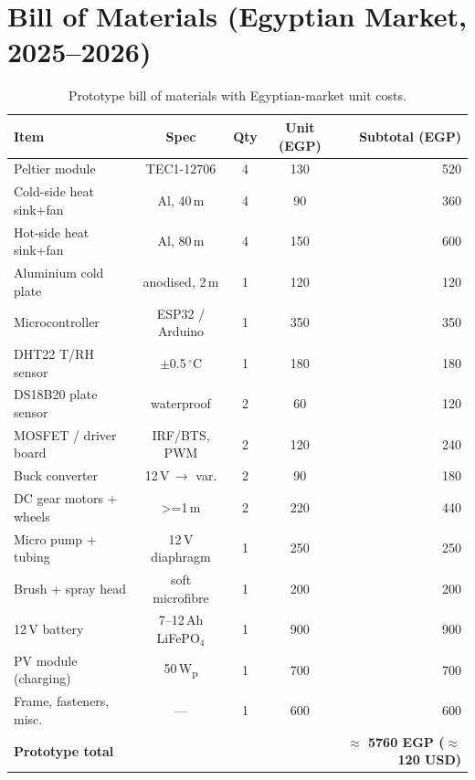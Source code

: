 \documentclass[12pt,a4paper]{report}
\newcommand{\SI}[2]{#1\,\mbox{#2}}
\newcommand{\SIrange}[3]{#1--#2\,\mbox{#3}}
\newcommand{\meter}{m}\newcommand{\metre}{m}
\newcommand{\ampere}{A}\newcommand{\hour}{h}\newcommand{\second}{s}
\newcommand{\volt}{V}\newcommand{\ohm}{\ensuremath{\Omega}}
\newcommand{\degreeCelsius}{\ensuremath{^{\circ}}C}
\newcommand{\Wp}{W\textsubscript{p}}
\begin{document}
\section{Bill of Materials (Egyptian Market, 2025--2026)}
\begin{table}[H]
  \centering
  \caption{Prototype bill of materials with Egyptian-market unit costs.}
  \label{tab:bom}
  \begin{tabular}{lcccr}
    \toprule
    \textbf{Item} & \textbf{Spec} & \textbf{Qty} & \textbf{Unit (EGP)} & \textbf{Subtotal (EGP)}\\
    \midrule
    Peltier module          & TEC1-12706                 & 4 & 130 & 520\\
    Cold-side heat sink+fan & Al, \SI{40}{\milli\meter}  & 4 & 90  & 360\\
    Hot-side heat sink+fan  & Al, \SI{80}{\milli\meter}  & 4 & 150 & 600\\
    Aluminium cold plate    & anodised, \SI{2}{\milli\meter} & 1 & 120 & 120\\
    Microcontroller         & ESP32 / Arduino            & 1 & 350 & 350\\
    DHT22 T/RH sensor       & $\pm$\SI{0.5}{\degreeCelsius} & 1 & 180 & 180\\
    DS18B20 plate sensor    & waterproof                 & 2 & 60  & 120\\
    MOSFET / driver board   & IRF/BTS, PWM               & 2 & 120 & 240\\
    Buck converter          & \SI{12}{\volt}\,$\to$ var. & 2 & 90  & 180\\
    DC gear motors + wheels & \SI{>=1}{\newton\meter}    & 2 & 220 & 440\\
    Micro pump + tubing     & \SI{12}{\volt} diaphragm   & 1 & 250 & 250\\
    Brush + spray head      & soft microfibre            & 1 & 200 & 200\\
    \SI{12}{\volt} battery  & \SIrange{7}{12}{\ampere\hour} LiFePO$_4$ & 1 & 900 & 900\\
    PV module (charging)    & \SI{50}{\Wp}           & 1 & 700 & 700\\
    Frame, fasteners, misc. & ---                        & 1 & 600 & 600\\
    \midrule
    \multicolumn{4}{l}{\textbf{Prototype total}} & \textbf{$\approx$ 5760 EGP ($\approx$ 120 USD)}\\
    \bottomrule
  \end{tabular}
\end{table}
\end{document}

